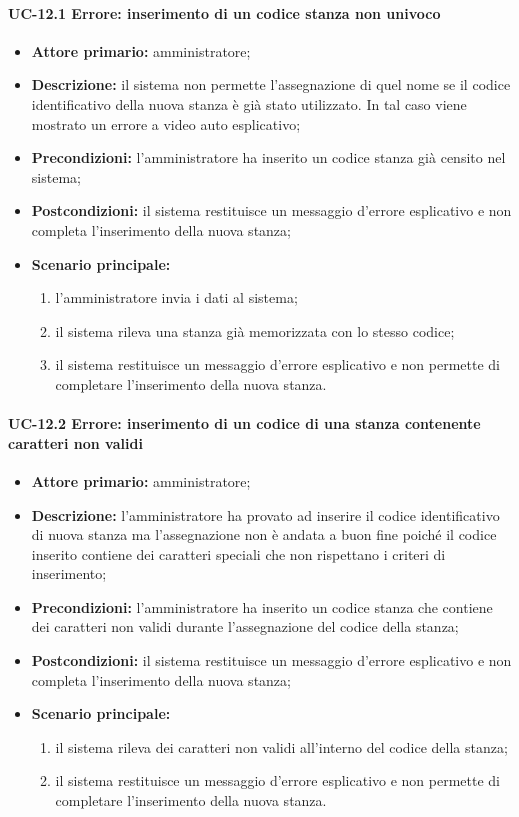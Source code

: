 \paragraph{UC-12.1 Errore: inserimento di un codice stanza non univoco}
\begin{itemize}
	\item \textbf{Attore primario:} amministratore;
	\item \textbf{Descrizione:} il sistema non permette l'assegnazione di quel nome se il codice identificativo della nuova stanza è già stato utilizzato. In tal caso viene mostrato un errore a video auto esplicativo;
	\item \textbf{Precondizioni:} l'amministratore ha inserito un codice stanza già censito nel sistema;
	\item \textbf{Postcondizioni:} il sistema restituisce un messaggio d'errore esplicativo e non completa l'inserimento della nuova stanza;
	\item \textbf{Scenario principale:}
	      \begin{enumerate}
	      	      \item l'amministratore invia i dati al sistema;
		      \item il sistema rileva una stanza già memorizzata con lo stesso codice;
		      \item il sistema restituisce un messaggio d'errore esplicativo e non permette di completare l'inserimento della nuova stanza.
	      \end{enumerate}
\end{itemize}

\paragraph{UC-12.2 Errore: inserimento di un codice di una stanza contenente caratteri non validi}
\begin{itemize}
	\item \textbf{Attore primario:} amministratore;
	\item \textbf{Descrizione:} l'amministratore ha provato ad inserire il codice identificativo di nuova stanza ma l'assegnazione non è andata a buon fine poiché il codice inserito contiene dei caratteri speciali che non rispettano i criteri di inserimento;
	\item \textbf{Precondizioni:} l'amministratore ha inserito un codice stanza che contiene dei caratteri non validi durante l'assegnazione del codice della stanza;
	\item \textbf{Postcondizioni:} il sistema restituisce un messaggio d'errore esplicativo e non completa l'inserimento della nuova stanza;
	\item \textbf{Scenario principale:}
	      \begin{enumerate}
		      \item il sistema rileva dei caratteri non validi all'interno del codice della stanza;
		      \item il sistema restituisce un messaggio d'errore esplicativo e non permette di completare l'inserimento della nuova stanza.
	      \end{enumerate}
\end{itemize}




